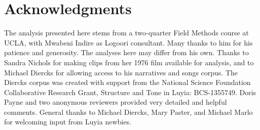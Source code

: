 \documentclass[output=paper]{langsci/langscibook}
\begin{document}
\begin{longtable}[l]{ll}



\end{longtable}

\section*{Acknowledgments}

The analysis presented here stems from a two-quarter Field Methods course at UCLA, with Mwabeni Indire as Logoori consultant. Many thanks to him for his patience and generosity. The analyses here may differ from his own. Thanks to Sandra Nichols for making clips from her 1976 film available for analysis, and to Michael Diercks for allowing access to his narratives and songs corpus. The Diercks corpus was created with support from the National Science Foundation Collaborative Research Grant, Structure and Tone in Luyia: BCS-1355749. Doris Payne and two anonymous reviewers provided very detailed and helpful comments. General thanks to Michael Diercks, Mary Paster, and Michael Marlo for welcoming input from Luyia newbies.

\printbibliography[heading=subbibliography,notkeyword=this]
\end{document}
